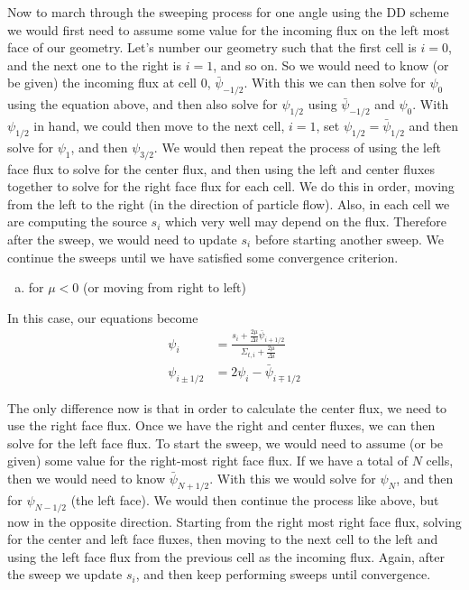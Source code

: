 \documentclass[10pt]{article}
\begin{document}
Now to march through the sweeping process for one angle using the DD scheme we would first need to assume some value for the incoming flux on the left most face of our geometry. Let's number our geometry such that the first cell is $i=0$, and the next one to the right is $i=1$, and so on. So we would need to know (or be given) the incoming flux at cell 0, $\bar{\psi}_{-1/2}$. With this we can then solve for $\psi_0$ using the equation above, and then also solve for $\psi_{1/2}$ using $\bar{\psi}_{-1/2}$ and $\psi_0$. With $\psi_{1/2}$ in hand, we could then move to the next cell, $i=1$, set $\psi_{1/2} = \bar{\psi}_{1/2}$ and then solve for $\psi_1$, and then $\psi_{3/2}$. We would then repeat the process of using the left face flux to solve for the center flux, and then using the left and center fluxes together to solve for the right face flux for each cell. We do this in order, moving from the left to the right (in the direction of particle flow). Also, in each cell we are computing the source $s_i$ which very well may depend on the flux. Therefore after the sweep, we would need to update $s_i$ before starting another sweep. We continue the sweeps until we have satisfied some convergence criterion.

%
%
%

\vspace{40pt}
\begin{enumerate}[(b)]
\item for $\mu < 0$ (or moving from right to left)
\end{enumerate}

In this case, our equations become
%
\begin{align*}
\psi_{i} &= \frac{s_{i} + \frac{2\mu}{\Delta i}\bar{\psi}_{i+1/2}}{\Sigma_{t,i} + \frac{2\mu}{\Delta i}} \\
\psi_{i\pm1/2} &= 2\psi_{i} - \bar{\psi}_{i\mp1/2}
\end{align*}

The only difference now is that in order to calculate the center flux, we need to use the right face flux. Once we have the right and center fluxes, we can then solve for the left face flux. To start the sweep, we would need to assume (or be given) some value for the right-most right face flux. If we have a total of $N$ cells, then we would need to know $\bar{\psi}_{N+1/2}$. With this we would solve for $\psi_N$, and then for $\psi_{N-1/2}$ (the left face). We would then continue the process like above, but now in the opposite direction. Starting from the right most right face flux, solving for the center and left face fluxes, then moving to the next cell to the left and using the left face flux from the previous cell as the incoming flux. Again, after the sweep we update $s_i$, and then keep performing sweeps until convergence.
\end{document}
